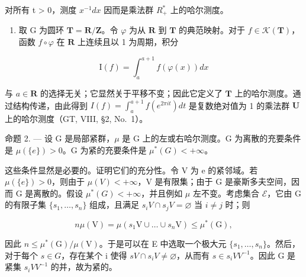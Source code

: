 对所有 t \textgreater{} 0，测度 \(x^{-1} dx\) 因而是乘法群 \(R_{+}^{*}\) 上的哈尔测度。

\begin{enumerate}
\def\labelenumi{\arabic{enumi})}
\setcounter{enumi}{2}
\tightlist
\item
  取 G 为圆环 \(\mathbf{T} = \mathbf{R} / \mathbf{Z}\)。令 \(\varphi\) 为从 \(\mathbf{R}\) 到 \(\mathbf{T}\) 的典范映射。对于 \(f \in \mathcal{K}(\mathbf{T})\)，函数 \(f \circ \varphi\) 在 \(\mathbf{R}\) 上连续且以 1 为周期，积分
\end{enumerate}

\[
\mathrm{I} (f) = \int_ {a} ^ {a + 1} f (\varphi (x)) d x
\]

与 \(a \in \mathbf{R}\) 的选择无关；它显然关于平移不变；因此它定义了 \(\mathbf{T}\) 上的哈尔测度。通过结构传递，由此得到 \(I(f) = \int_{a}^{a + 1} f(e^{2\pi it}) dt\) 是复数绝对值为 1 的乘法群 \(\mathbf{U}\) 上的哈尔测度（GT, VIII, §2, No.~1）。

命题 2. --- 设 G 是局部紧群，\(\mu\) 是 G 上的左或右哈尔测度。G 为离散的充要条件是 \(\mu(\{e\}) > 0\)。G 为紧的充要条件是 \(\mu^{*}(G) < +\infty\)。

这些条件显然是必要的。证明它们的充分性。令 V 为 e 的紧邻域。若 \(\mu(\{e\}) > 0\)，则由于 \(\mu(V) < +\infty\)，V 是有限集；由于 G 是豪斯多夫空间，因而 G 是离散的。假设 \(\mu^{*}(G)<+\infty\)，并且例如 \(\mu\) 左不变。考虑集合 \(\mathscr{E}\)，它由 G 的有限子集 \(\{s_{1},\ldots,s_{n}\}\) 组成，且满足 \(s_{i}V\cap s_{j}V=\varnothing\) 当 \(i\neq j\) 时；则

\[
n \mu (\mathrm{V}) = \mu (s _ {1} \mathrm{V} \cup \dots \cup s _ {n} \mathrm{V}) \leqslant \mu^ {*} (\mathrm{G}),
\]

因此 \(n \leqslant \mu^{*}(\mathrm{G})/\mu(\mathrm{V})\)。于是可以在 E 中选取一个极大元 \(\{s_{1},\ldots,s_{n}\}\)。然后，对于每个 \(s \in G\)，存在某个 i 使得 \(sV \cap s_{i}V \neq \varnothing\)，从而有 \(s \in s_{i}VV^{-1}\)。因此 G 是紧集 \(s_{i}VV^{-1}\) 的并，故为紧的。

